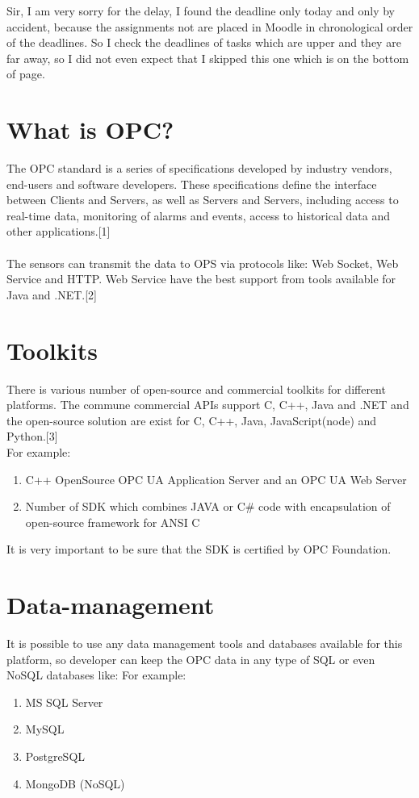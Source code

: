 \documentclass[english]{article}
\date{}
\begin{document}
Sir, I am very sorry for the delay, I found the deadline only today and only by accident, because the assignments not are placed in Moodle in chronological order of the deadlines. So I check the deadlines of tasks which are upper and they are far away, so I did not even expect that I skipped this one which is on the bottom of page.
\section{What is OPC?}

The OPC standard is a series of specifications developed by industry vendors, end-users and software developers. These specifications define the interface between Clients and Servers, as well as Servers and Servers, including access to real-time data, monitoring of alarms and events, access to historical data and other applications.[1]\\\\

The sensors can transmit the data to OPS via protocols like: Web Socket, Web Service and HTTP. Web Service have the best support from tools available for Java and .NET.[2]

\section{Toolkits}

There is various number of open-source and commercial toolkits for different platforms. The commune commercial APIs support C, C++, Java and .NET and the open-source solution are exist for C, C++, Java, JavaScript(node) and Python.[3]\\

For example:
\begin{enumerate}
\item  C++ OpenSource OPC UA Application Server and an OPC UA Web Server
\item Number of SDK which combines JAVA or C\# code with encapsulation of open-source framework for ANSI C 
\end{enumerate}

It is very important to be sure that the SDK is certified by OPC Foundation.


\section{Data-management}

It is possible to use any data management tools and databases available for this platform, so developer can keep the OPC data in any type of SQL or even NoSQL databases like:
For example:
\begin{enumerate}
\item MS SQL Server
\item MySQL
\item PostgreSQL
\item MongoDB (NoSQL)
\end{enumerate}
\end{document}
